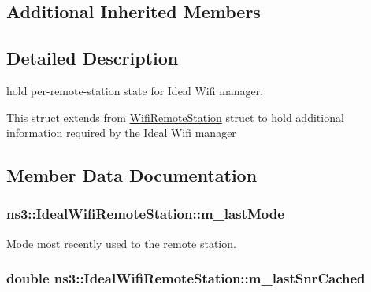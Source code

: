 \subsection*{Additional Inherited Members}


\subsection{Detailed Description}
hold per-\/remote-\/station state for Ideal Wifi manager. 

This struct extends from \hyperlink{structns3_1_1WifiRemoteStation}{Wifi\+Remote\+Station} struct to hold additional information required by the Ideal Wifi manager 

\subsection{Member Data Documentation}
\subsubsection[{\texorpdfstring{m\+\_\+last\+Mode}{m_lastMode}}]{ ns3\+::\+Ideal\+Wifi\+Remote\+Station\+::m\+\_\+last\+Mode}\hypertarget{structns3_1_1IdealWifiRemoteStation_a0f12556151d7c08a087bb4392070f6fe}{}\label{structns3_1_1IdealWifiRemoteStation_a0f12556151d7c08a087bb4392070f6fe}


Mode most recently used to the remote station. 

\subsubsection[{\texorpdfstring{m\+\_\+last\+Snr\+Cached}{m_lastSnrCached}}]{\setlength{\rightskip}{0pt plus 5cm}double ns3\+::\+Ideal\+Wifi\+Remote\+Station\+::m\+\_\+last\+Snr\+Cached}\hypertarget{structns3_1_1IdealWifiRemoteStation_a27a1926ef8173e8d0b5ee722037030a7}{}\label{structns3_1_1IdealWifiRemoteStation_a27a1926ef8173e8d0b5ee722037030a7}


